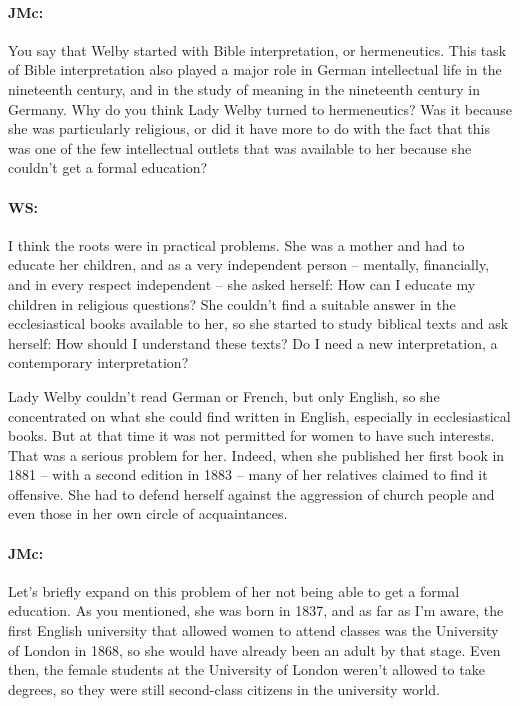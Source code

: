 \documentclass[output=paper]{langscibook}
\begin{document}
\paragraph*{JMc:} You say that Welby started with Bible interpretation, or hermeneutics. This task of Bible interpretation also played a major role in German intellectual life in the nineteenth century, and in the study of meaning in the nineteenth century in Germany. Why do you think Lady Welby turned to hermeneutics? Was it because she was particularly religious, or did it have more to do with the fact that this was one of the few intellectual outlets that was available to her because she couldn’t get a formal education?

\paragraph*{WS:} I think the roots were in practical problems. She was a mother and had to educate her children, and as a very independent person – mentally, financially, and in every respect independent – she asked herself: How can I educate my children in religious questions? She couldn’t find a suitable answer in the ecclesiastical books available to her, so she started to study biblical texts and ask herself: How should I understand these texts? Do I need a new interpretation, a contemporary interpretation?

Lady Welby couldn’t read German or French, but only English, so she concentrated on what she could find written in English, especially in ecclesiastical books. But at that time it was not permitted for women to have such interests. That was a serious problem for her. Indeed, when she published her first book in 1881 – with a second edition in 1883 – many of her relatives claimed to find it offensive. She had to defend herself against the aggression of church people and even those in her own circle of acquaintances.

\paragraph*{JMc:} Let’s briefly expand on this problem of her not being able to get a formal education. As you mentioned, she was born in 1837, and as far as I’m aware, the first English university that allowed women to attend classes was the University of London in 1868, so she would have already been an adult by that stage. Even then, the female students at the University of London weren’t allowed to take degrees, so they were still second-class citizens in the university world.
\end{document}
